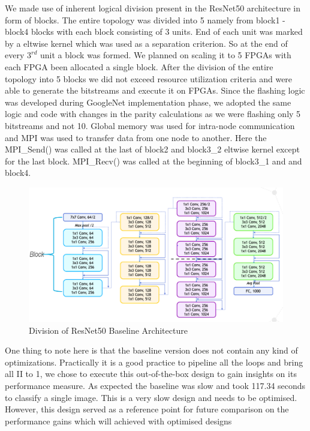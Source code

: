 We made use of inherent logical division present in the ResNet50 architecture in form of blocks. The entire topology was divided into 5 namely from block1 - block4 blocks with each block consisting of 3 units. End of each unit was marked by a eltwise kernel which was used as a separation criterion. So at the end of every $3^{rd}$ unit a block was formed. We planned on scaling it to 5 FPGAs with each FPGA been allocated a single block. 
After the division of the entire topology into 5 blocks we did not exceed resource utilization criteria and were able to generate the bitstreams and execute it on FPGAs. Since the flashing logic was developed during GoogleNet implementation phase, we adopted the same logic and code with changes in the parity calculations as we were flashing only 5 bitstreams and not 10. 
Global memory was used for intra-node communication and MPI was used to transfer data from one node to another. Here the MPI\_Send() was called at the last of block2 and block3\_2 eltwise kernel except for the last block. MPI\_Recv() was called at the beginning of block3\_1 and and block4.
\begin{figure}[!htb]
  \includegraphics[width=\textwidth,height=\textheight,keepaspectratio]{img/ResNet_division.png}
  \caption{Division of ResNet50 Baseline Architecture}
  \label{fig:ResNet50_baseline_division}
\end{figure}
\newline
One thing to note here is that the baseline version does not contain any kind of optimizations. Practically it is a good practice to pipeline all the loops and bring all II to 1, we chose to execute this out-of-the-box design to gain insights on its performance measure.
As expected the baseline was slow and took 117.34 seconds to classify a single image. This is a very slow design and needs to be optimised. However, this design served as a reference point for future comparison on the performance gains which will achieved with optimised designs
